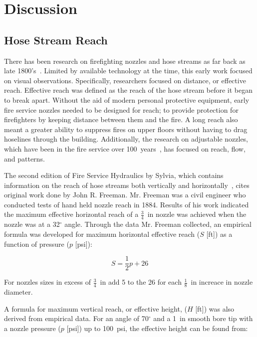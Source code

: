 \documentclass[12pt,oneside]{book}
\begin{document}
\chapter{Discussion}

\section{Hose Stream Reach}
\label{sec:hose_reach}
There has been research on firefighting nozzles and hose streams as far back as late 1800's~\cite{CHICAGO_TRIBUNE:1339:a}. Limited by available technology at the time, this early work focused on visual observations. Specifically, researchers focused on distance, or effective reach. Effective reach was defined as the reach of the hose stream before it began to break apart. Without the aid of modern personal protective equipment, early fire service nozzles needed to be designed for reach; to provide protection for firefighters by keeping distance between them and the fire. A long reach also meant a greater ability to suppress fires on upper floors without having to drag hoselines through the building. Additionally, the research on adjustable nozzles, which have been in the fire service over 100~years~\cite{PALMER:1878}, has focused on reach, flow, and patterns. 

The second edition of Fire Service Hydraulics by Sylvia, which contains information on the reach of hose streams both vertically and horizontally~\cite{SYLVIA:1970}, cites original work done by John R. Freeman. Mr. Freeman was a civil engineer who conducted tests of hand held nozzle reach in 1884. Results of his work indicated the maximum effective horizontal reach of a $\frac{3}{4}$~in nozzle was achieved when the nozzle was at a 32$^\circ$ angle. Through the data Mr. Freeman collected, an empirical formula was developed for maximum horizontal effective reach ($S$ [ft]) as a function of pressure ($p$ [psi]): 

\begin{equation*}
	S = \frac{1}{2}p+26
\end{equation*}

For nozzles sizes in excess of $\frac{3}{4}$~in add 5 to the 26 for each $\frac{1}{8}$~in increace in nozzle diameter. 

A formula for maximum vertical reach, or effective height, ($H$ [ft]) was also derived from empirical data. For an angle of 70$^{\circ}$ and a 1~in smooth bore tip with a nozzle pressure ($p$ [psi]) up to 100~psi, the effective height can be found from:
\end{document}
